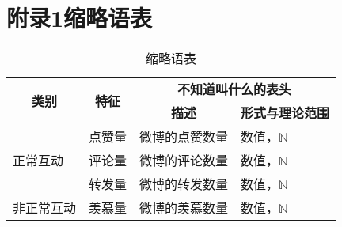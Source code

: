 \documentclass[../main.tex]{subfiles}
\begin{document}
\section*{附录1\quad{}缩略语表}

\begin{table}[!htbp]
  \centering
  \begin{tabular}{l|l|l|l}
		\hline
        \multicolumn{1}{c|}{\multirow{2}{*}{\textbf{类别}}} & \multicolumn{1}{c|}{\multirow{2}{*}{\textbf{特征}}} & \multicolumn{2}{c}{\textbf{不知道叫什么的表头}} \\
        \cline{3-4}
         & & \multicolumn{1}{c|}{\textbf{描述}} & \multicolumn{1}{c}{\textbf{形式与理论范围}} \\
		\hline
        \multirow{3}{*}{正常互动} & 点赞量 & 微博的点赞数量 & 数值，$\mathbb{N}$ \\
		\cline{2-4}
         & 评论量 & 微博的评论数量 & 数值，$\mathbb{N}$ \\
		\cline{2-4}
         & 转发量 & 微博的转发数量 & 数值，$\mathbb{N}$ \\
		\hline
        非正常互动 & 羡慕量 & 微博的羡慕数量 & 数值，$\mathbb{N}$ \\
    \hline
  \end{tabular}
  \renewcommand{\arraystretch}{1.38}%
  \setlength{\abovecaptionskip}{0pt}%
  \setlength{\belowcaptionskip}{10pt}%
  \caption{缩略语表}
  \label{tab:1}
\end{table}
\end{document}
